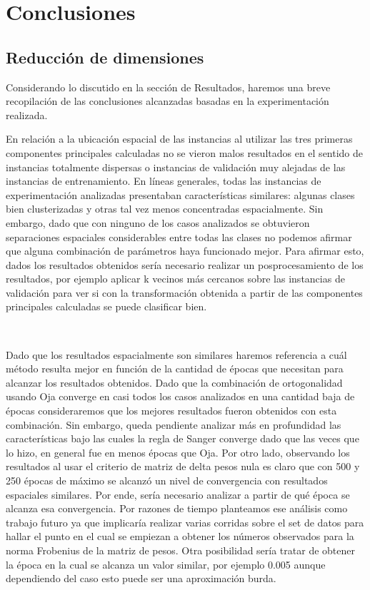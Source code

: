 \documentclass[informe.tex]{subfiles}
\begin{document}
  
  \section{Conclusiones}

    \subsection{Reducción de dimensiones}
      Considerando lo discutido en la sección de Resultados, haremos una breve recopilación de las conclusiones alcanzadas basadas en la experimentación realizada. 
      
      En relación a la ubicación espacial de las instancias al utilizar las tres primeras componentes principales calculadas no se vieron malos resultados en el sentido de instancias totalmente dispersas o instancias de validación muy alejadas de las instancias de entrenamiento. En líneas generales, todas las instancias de experimentación analizadas presentaban características similares: algunas clases bien clusterizadas y otras tal vez menos concentradas espacialmente. Sin embargo, dado que con ninguno de los casos analizados se obtuvieron separaciones espaciales considerables entre todas las clases no podemos afirmar que alguna combinación de parámetros haya funcionado mejor. Para afirmar esto, dados los resultados obtenidos sería necesario realizar un posprocesamiento de los resultados, por ejemplo aplicar k vecinos más cercanos sobre las instancias de validación para ver si con la transformación obtenida a partir de las componentes principales calculadas se puede clasificar bien.
      
      ~
      
      Dado que los resultados espacialmente son similares haremos referencia a cu\'al m\'etodo resulta mejor en funci\'on de la cantidad de \'epocas que necesitan para alcanzar los resultados obtenidos. Dado que la combinación de ortogonalidad usando Oja converge en casi todos los casos analizados en una cantidad baja de épocas consideraremos que los mejores resultados fueron obtenidos con esta combinación. Sin embargo, queda pendiente analizar más en profundidad las características bajo las cuales la regla de Sanger converge dado que las veces que lo hizo, en general fue en menos épocas que Oja. Por otro lado, observando los resultados al usar el criterio de matriz de delta pesos nula es claro que con 500 y 250 \'epocas de máximo se alcanzó un nivel de convergencia con resultados espaciales similares. Por ende, sería necesario analizar a partir de qué época se alcanza esa convergencia. Por razones de tiempo planteamos ese análisis como trabajo futuro ya que implicaría realizar varias corridas sobre el set de datos para hallar el punto en el cual se empiezan a obtener los números observados para la norma Frobenius de la matriz de pesos. Otra posibilidad sería tratar de obtener la época en la cual se alcanza un valor similar, por ejemplo 0.005 aunque dependiendo del caso esto puede ser una aproximación burda.
      
\end{document}
